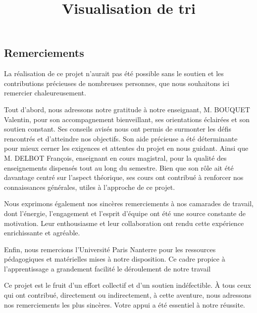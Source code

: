 \documentclass[a4paper, 12pt, twoside]{article}
\title{Visualisation de tri}
\begin{document}
\pagedegarde
\begin{center}
    \section*{Remerciements}
    \end{center}
    
\vspace{80pt} %

La réalisation de ce projet n'aurait pas été possible sans le soutien et les contributions précieuses de nombreuses personnes, que nous souhaitons ici remercier chaleureusement.
\vspace{12pt} %
\newline

Tout d'abord, nous adressons notre gratitude à notre enseignant, M. BOUQUET Valentin, pour son accompagnement bienveillant, ses orientations éclairées et son soutien constant. Ses conseils avisés nous ont permis de surmonter les défis rencontrés et d’atteindre nos objectifs. Son aide précieuse a été déterminante pour mieux cerner les exigences et attentes du projet en nous guidant. Ainsi que M. DELBOT François, enseignant en cours magistral, pour la qualité des enseignements dispensés tout au long du semestre. Bien que son rôle ait été davantage centré sur l’aspect théorique, ses cours ont contribué à renforcer nos connaissances générales, utiles à l’approche de ce projet. 
\vspace{12pt} %
\newline

Nous exprimons également nos sincères remerciements à nos camarades de travail, dont l'énergie, l'engagement et l'esprit d'équipe ont été une source constante de motivation. Leur enthousiasme et leur collaboration ont rendu cette expérience enrichissante et agréable.
\vspace{12pt} %
\newline

Enfin, nous remercions l’Université Paris Nanterre pour les ressources pédagogiques et matérielles mises à notre disposition. Ce cadre propice à l’apprentissage a grandement facilité le déroulement de notre travail
\newline

Ce projet est le fruit d’un effort collectif et d’un soutien indéfectible. À tous ceux qui ont contribué, directement ou indirectement, à cette aventure, nous adressons nos remerciements les plus sincères. Votre appui a été essentiel à notre réussite.
\newpage
\end{document}
